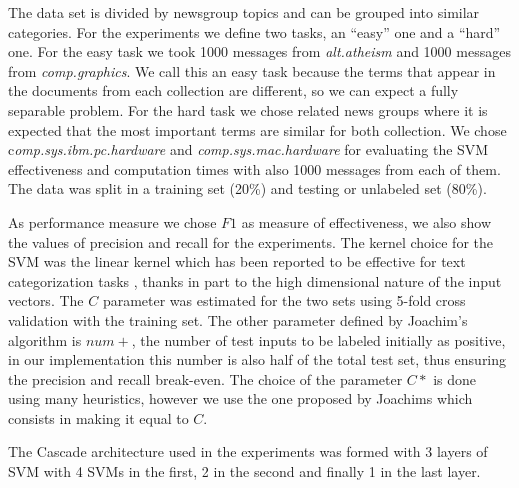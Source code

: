 The data set is divided by newsgroup topics and can
be grouped into similar categories. For the experiments we define
two tasks, an {}``easy'' one and a {}``hard'' one. For the easy
task we took 1000 messages from \emph{alt.atheism }and 1000 messages
from \emph{comp.graphics}. We call this an easy task because the terms
that appear in the documents from each collection are different, so
we can expect a fully separable problem. For the hard task we chose related
news groups where it is expected that the most important terms are similar
for both collection. We chose c\emph{omp.sys.ibm.pc.hardware} and
\emph{comp.sys.mac.hardware }for evaluating the SVM effectiveness
and computation times with also 1000 messages from each of them. The
data was split in a training set (20\%) and testing or unlabeled set
(80\%). 

As performance measure we chose $F1$ as measure of effectiveness,
we also show the values of precision and recall for the experiments.
The kernel choice for the SVM was the linear kernel which has been
reported to be effective for text categorization tasks \cite{Joachims99c,DumaisPHS98},
thanks in part to the high dimensional nature of the input vectors.
The $C$ parameter was estimated for the two sets using 5-fold cross
validation with the training set. The other parameter defined by Joachim's
algorithm is $num+$, the number of test inputs to be labeled initially
as positive, in our implementation this number is also half of the
total test set, thus ensuring the precision and recall break-even.
The choice of the parameter $C*$ is done using many heuristics, however
we use the one proposed by Joachims which consists in making it equal
to $C$. %
%

The Cascade architecture used in the experiments was formed with 3 layers
of SVM with 4 SVMs in the first, 2 in the second and finally 1 in the
last layer.

